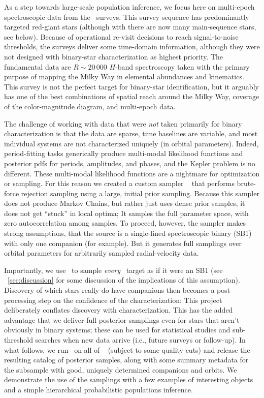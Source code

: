 \documentclass[modern]{aastex63}
\begin{document}
As a step towards large-scale population inference, we focus here on multi-epoch
spectroscopic data from the \apogee\ surveys.
This survey sequence has predominantly targeted red-giant stars (although with
 there are now many main-sequence stars, see below).
Because of operational re-visit decisions to reach signal-to-noise thresholds,
the surveys deliver some time-domain information, although they were not
designed with binary-star characterization as highest priority.
The fundamental data are $R\sim 20\,000$ $H$-band spectroscopy taken with the
primary purpose of mapping the Milky Way in elemental abundances and kinematics.
This survey is not the perfect target for binary-star identification, but it
arguably has one of the best combinations of spatial reach around the Milky Way,
coverage of the color-magnitude diagram, and multi-epoch data.

The challenge of working with data that were \emph{not} taken primarily for
binary characterization is that the data are sparse, time baselines are
variable, and most individual systems are not characterized uniquely (in orbital
parameters).
Indeed, period-fitting tasks generically produce multi-modal likelihood
functions and posterior pdfs for periods, amplitudes, and phases, and the Kepler
problem is no different.
These multi-modal likelihood functions are a nightmare for optimization or
sampling.
For this reason we created a custom sampler \thejoker\ \citep{thejoker} that
performs brute-force rejection sampling using a large, initial prior sampling.
Because this sampler does not produce Markov Chains, but rather just uses dense
prior samples, it does not get ``stuck'' in local optima; It samples the full
parameter space, with zero autocorrelation among samples.
To proceed, however, the sampler makes strong assumptions, that the source is a
single-lined spectroscopic binary (SB1) with only one companion (for example).
But it generates full samplings over orbital parameters for arbitrarily sampled
radial-velocity data.

Importantly, we use \thejoker\ to sample \emph{every} \apogee\ target as if it
were an SB1 (see \sectionname~\ref{sec:discussion} for some discussion of the
implications of this assumption).
Discovery of which stars really do have companions then becomes a
post-processing step on the confidence of the characterization: This project
deliberately conflates discovery with characterization.
This has the added advantage that we deliver full posterior samplings even for
stars that aren't obviously in binary systems; these can be used for statistical
studies and sub-threshold searches when new data arrive (i.e., future surveys or
follow-up).
In what follows, we run \thejoker\ on all of \apogee\  (subject to some
quality cuts) and release the resulting catalog of posterior samples, along with
some summary metadata for the subsample with good, uniquely determined
companions and orbits.
We demonstrate the use of the samplings with a few examples of interesting
objects and a simple hierarchical probabilistic populations inference.
\end{document}
